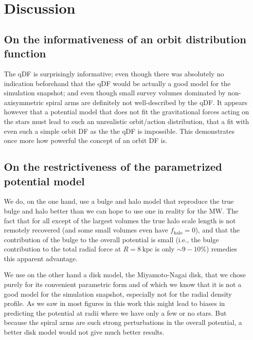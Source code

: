 \documentclass[iop,revtex4,numberedappendix,appendixfloats]{emulateapj}
\begin{document}
\section{Discussion} \label{sec:discussion}

\subsection{On the informativeness of an orbit distribution function}

The qDF is surprisingly informative; even though there was absolutely no indication beforehand that the qDF would be actually a good model for the simulation snapshot; and even though small survey volumes dominated by non-axisymmetric spiral arms are definitely not well-described by the qDF. It appears however that a potential model that does not fit the gravitational forces acting on the stars must lead to such an unrealistic orbit/action distribution, that a fit with even such a simple orbit DF as the the qDF is impossible. This demonstrates once more how powerful the concept of an orbit DF is.

\subsection{On the restrictiveness of the parametrized potential model}

We do, on the one hand, use a bulge and halo model that reproduce the true bulge and halo better than we can hope to use one in reality for the MW. The fact that for all except of the largest volumes the true halo scale length is not remotely recovered (and some small volumes even have $f_\text{halo}=0$), and that the contribution of the bulge to the overall potential is small (i.e., the bulge contribution to the total radial force at $R=8~\text{kpc}$ is only $\sim 9-10\%$) remedies this apparent advantage. 

We use on the other hand a disk model, the Miyamoto-Nagai disk, that we chose purely for its convenient parametric form and of which we know that it is not a good model for the simulation snapshot, especially not for the radial density profile. As we saw in most figures in this work this might lead to biases in predicting the potential at radii where we have only a few or no stars. But because the spiral arms are such strong perturbations in the overall potential, a better disk model would not give much better results.
\end{document}
